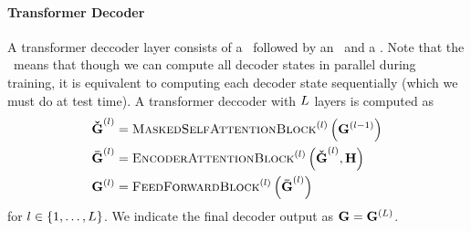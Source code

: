 

   
\paragraph{{Transformer Decoder}}
    A transformer deccoder layer consists of a \maskedselfattentionblock~followed
    by an \encoderattentionblock~and a \feedforwardblock. Note that the \maskedselfattentionblock~means that though we can compute all decoder states
    in parallel during training, it is equivalent to computing each decoder state sequentially (which we must do at test time). 
    A transformer deccoder with $L$ layers
    is computed as
\begin{align*} 
    {\boldsymbol{\check{\mathbf{G}}}}^{(l)} & = \textsc{MaskedSelfAttentionBlock}^{(l)}\left(\mathbf{G}^{(l-1)}\right) \\
    {\boldsymbol{\bar{\mathbf{G}}}}^{(l)} & = \textsc{EncoderAttentionBlock}^{(l)}\left(\boldsymbol{\check{\mathbf{G}}}^{(l)}, \mathbf{H}\right) \\
    \mathbf{G}^{(l)} & = \textsc{FeedForwardBlock}^{(l)}\left({\boldsymbol{\bar{\mathbf{G}}}^{(l)}}\right)
\end{align*} for $l \in \{1,\ldots,L\}$.
We indicate the final decoder output as $\mathbf{G} =  \mathbf{G}^{(L)}$.

